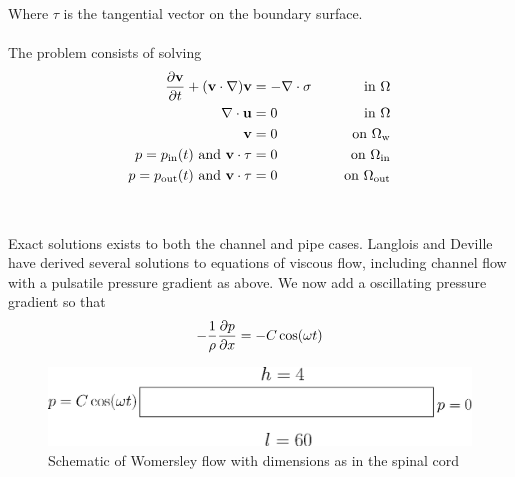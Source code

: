 Where $\tau$ is the tangential vector on the boundary surface.
\\
\\
The problem consists of solving
\begin{alignat}{4}
\frac{\partial \mathbf{v}}{\partial t} + (\mathbf{v} \cdot \nabla ) \mathbf{v} & = -\nabla \cdot \sigma \quad & \text{ in } \Omega \\
\nabla \cdot \mathbf{u} & = 0 \quad & \text{ in } \Omega\\
\mathbf{v} & =0 \quad & \text{ on } \Omega_{\text{w}} \\
p = p_{\text{in}}(t) \text{ and } \mathbf{v}\cdot \tau & = 0 \quad & \text{ on } \Omega_{\text{in}} \\
p = p_{\text{out}}(t) \text{ and } \mathbf{v}\cdot \tau & = 0 \quad &  \text{ on } \Omega_{\text{out}} \label{Womersley}
\end{alignat}
\\
\\
Exact solutions exists to both the channel and pipe cases. Langlois and Deville \cite{Lang64} have derived several solutions to equations of viscous flow, including channel flow with a pulsatile pressure gradient as above. We now add a oscillating pressure gradient so that
\begin{align}
-\frac{1}{\rho}\frac{\partial p}{\partial x} = -C\cos(\omega t)
\end{align}
\begin{center}
\begin{figure}[!ht]
\includegraphics[width=\linewidth]{figures/Womersley}
\caption{Schematic of Womersley flow with dimensions as in the spinal cord}
\end{figure}
\end{center}

